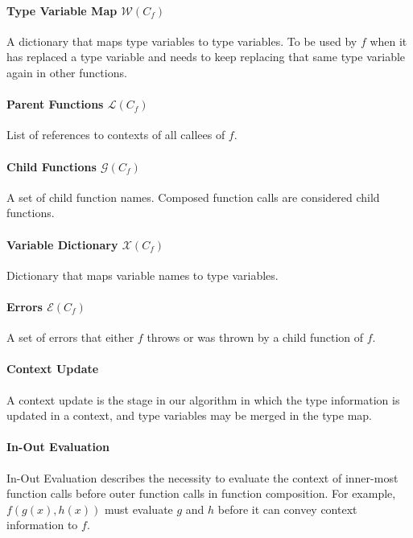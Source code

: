 \documentclass[10pt]{article}
\begin{document}
	\paragraph{Type Variable Map $\mathcal{W}(C_f)$}
	A dictionary that maps type variables to type variables. To be used by $f$
	when it has replaced a type variable and needs to keep replacing that same
	type variable again in other functions.

	\paragraph{Parent Functions $\mathcal{L}(C_f)$}
	List of references to contexts of all callees of $f$.

	\paragraph{Child Functions $\mathcal{G}(C_f)$}
	A set of child function names. Composed function calls are considered child
	functions.

	\paragraph{Variable Dictionary $\mathcal{X}(C_f)$}
	Dictionary that maps variable names to type variables.

	\paragraph{Errors $\mathcal{E}(C_f)$}
	A set of errors that either $f$ throws or was thrown by a child function of
	$f$.

	\paragraph{Context Update}
	A context update is the stage in our algorithm in which the type
	information is updated in a context, and type variables may be merged in
	the type map.

	\paragraph{In-Out Evaluation} 
	In-Out Evaluation describes the necessity to
	evaluate the context of inner-most function calls before outer function
	calls in function composition. For example, $f(g(x),h(x))$ must evaluate
	$g$ and $h$ before it can convey context information to $f$.

\pagebreak
\end{document}
